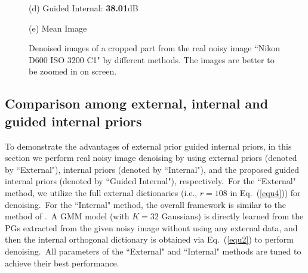 \documentclass[10pt,twocolumn,letterpaper]{article}
\begin{document}
\begin{figure}
{\begin{minipage}[t]{0.195\textwidth}
{\footnotesize (d) Guided Internal: \textbf{38.01}dB }
\end{minipage}
\begin{minipage}[t]{0.195\textwidth}
\centering
{}
{\footnotesize (e) Mean Image \cite{crosschannel2016}}
\end{minipage}
}
\vspace{-2mm}
\caption{Denoised images of a cropped part from the real noisy image ``Nikon D600 ISO 3200 C1" \cite{crosschannel2016} by different methods. The 
\vspace{-0.5mm}
images are better to be zoomed in on screen.}
\vspace{-1mm}
\label{fig5}
\end{figure}


\subsection{Comparison among external, internal and guided internal priors}

To demonstrate the advantages of external prior guided internal priors, in this section we perform real noisy image denoising by using external priors (denoted by ``External"), internal priors (denoted by ``Internal"), and the proposed guided internal priors (denoted by ``Guided Internal"), respectively.\ For the ``External" method, we utilize the full external dictionaries (i.e., $r=108$ in Eq.\ (\ref{equ4})) for denoising.\ For the ``Internal" method, the overall framework is similar to the method of \cite{ncsr}.\ A GMM model (with $K = 32$ Gaussians) is directly learned from the PGs extracted from the given noisy image without using any external data, and then the internal orthogonal dictionary is obtained via Eq.\ (\ref{equ2}) to perform denoising.\ All parameters of the ``External" and ``Internal" methods are tuned to achieve their best performance. 
\end{document}
